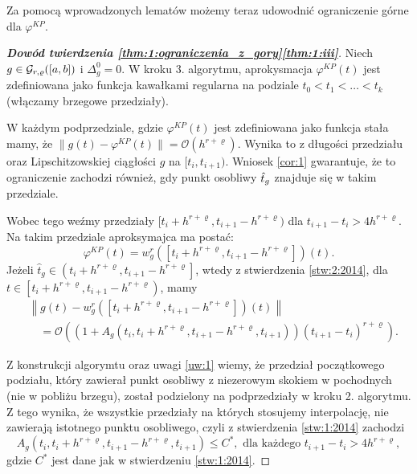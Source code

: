 \documentclass[oik, pdftex, robocza, man]{mgrwms}
\begin{document}
    Za pomocą wprowadzonych lematów możemy teraz udowodnić ograniczenie górne dla $\varphi^{KP}$.

    \begin{proof}[\textbf{Dowód twierdzenia \ref{thm:1:ograniczenia_z_gory}\ref{thm:1:iii}}]
        Niech $g \in \mathcal{G}_{r,\varrho}([a,b])$ i $\Delta_{g}^{0} = 0$. W kroku 3. algorytmu, aprokysmacja $\varphi^{KP}(t)$ jest zdefiniowana jako funkcja kawałkami regularna na podziale $t_{0} < t_{1} < \ldots < t_{k}$ (włączamy brzegowe przedziały). 
        
        W każdym podprzedziale, gdzie $\varphi^{KP}(t)$ jest zdefiniowana jako funkcja stała mamy, że $\|g(t) - \varphi^{KP}(t)\| = \mathcal{O}(h^{r+\varrho})$. Wynika to z długości przedziału oraz Lipschitzowskiej ciągłości $g$ na $[t_{i}, t_{i+1})$. Wniosek \ref{cor:1} gwarantuje, że to ograniczenie zachodzi również, gdy punkt osobliwy $\hat{t}_{g}$ znajduje się w takim przedziale.

        Wobec tego weźmy przedziały $[t_{i} + h^{r+\varrho}, t_{i+1} - h^{r+\varrho})$ dla $t_{i+1}-t_{i} > 4h^{r+\varrho}$. Na takim przedziale aproksymajca ma postać:
        \begin{equation*}
            \varphi^{KP}(t)=w_{g}^{r}\left(\left[t_{i}+h^{r+\varrho}, t_{i+1}-h^{r+\varrho}\right]\right)(t).
        \end{equation*}
        Jeżeli $\hat{t}_{g} \in\left(t_{i}+h^{r+\varrho}, t_{i+1}-h^{r+\varrho}\right]$, wtedy z stwierdzenia \ref{stw:2:2014}, dla $t \in\left[t_{i}+h^{r+\varrho}, t_{i+1}-h^{r+\varrho}\right)$, mamy
        \begin{equation*}
            \begin{aligned}
                &\left\|g(t)-w_{g}^{r}\left(\left[t_{i}+h^{r+\varrho}, t_{i+1}-h^{r+\varrho}\right]\right)(t)\right\| \\
                &\quad=\mathcal{O}\left(\left(1+A_{g}\left(t_{i}, t_{i}+h^{r+\varrho}, t_{i+1}-h^{r+\varrho}, t_{i+1}\right)\right)\left(t_{i+1}-t_{i}\right)^{r+\varrho}\right).
            \end{aligned}                            
        \end{equation*}

        Z konstrukcji algorymtu oraz uwagi \ref{uw:1} wiemy, że przedział początkowego podziału, który zawierał punkt osobliwy z niezerowym skokiem w pochodnych (nie w pobliżu brzegu), został podzielony na podprzedziały w kroku 2. algorytmu. Z tego wynika, że wszystkie przedziały na których stosujemy interpolację, nie zawierają istotnego punktu osobliwego, czyli z stwierdzenia \ref{stw:1:2014} zachodzi
        \begin{equation*}
            A_{g}\left(t_{i}, t_{i}+h^{r+\varrho}, t_{i+1}-h^{r+\varrho}, t_{i+1}\right) \leq C^{*}, \text{ dla każdego } t_{i+1} - t_{i} > 4h^{r+\varrho},
        \end{equation*}
        gdzie $C^{*}$ jest dane jak w stwierdzeniu \ref{stw:1:2014}.


\end{proof}
\end{document}
